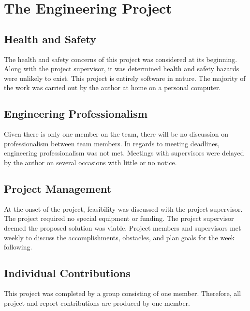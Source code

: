 \chapter{The Engineering Project}
\label{chap:project}


\section{Health and Safety}

The health and safety concerns of this project was considered at its beginning. Along with the project supervisor, it was determined health and safety hazards were unlikely to exist. This project is entirely software in nature. The majority of the work was carried out by the author at home on a personal computer.


\section{Engineering Professionalism}

Given there is only one member on the team, there will be no discussion on professionalism between team members. In regards to meeting deadlines, engineering professionalism was not met. Meetings with supervisors were delayed by the author on several occasions with little or no notice. 


\section{Project Management}

At the onset of the project, feasibility was discussed with the project supervisor. The project required no special equipment or funding. The project supervisor deemed the proposed solution was viable. Project members and supervisors met weekly to discuss the accomplishments, obstacles, and plan goals for the week following. 


\section{Individual Contributions}

This project was completed by a group consisting of one member. Therefore, all project and report contributions are produced by one member.
